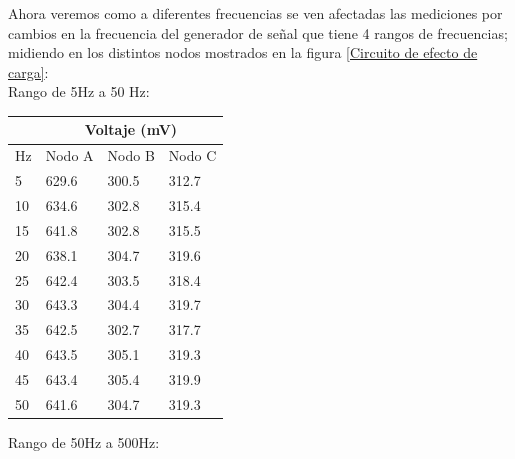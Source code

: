 Ahora veremos como a diferentes frecuencias se ven afectadas las mediciones por cambios en la frecuencia del generador de señal que tiene 4 rangos de frecuencias; midiendo en los distintos nodos mostrados en la figura \ref{Circuito de efecto de carga}:\\

Rango de 5Hz a 50 Hz:

\begin{table}[H]
\centering
\begin{tabular}{l|lll|}
\cline{2-4}
                         & \multicolumn{3}{c|}{Voltaje (mV)}                                  \\ \hline
\multicolumn{1}{|l|}{Hz} & \multicolumn{1}{c|}{Nodo A} & \multicolumn{1}{l|}{Nodo B} & Nodo C \\ \hline
\multicolumn{1}{|l|}{5}  & \multicolumn{1}{l|}{629.6}  & \multicolumn{1}{l|}{300.5}  & 312.7  \\ \hline
\multicolumn{1}{|l|}{10} & \multicolumn{1}{l|}{634.6}  & \multicolumn{1}{l|}{302.8}  & 315.4  \\ \hline
\multicolumn{1}{|l|}{15} & \multicolumn{1}{l|}{641.8}  & \multicolumn{1}{l|}{302.8}  & 315.5  \\ \hline
\multicolumn{1}{|l|}{20} & \multicolumn{1}{l|}{638.1}  & \multicolumn{1}{l|}{304.7}  & 319.6  \\ \hline
\multicolumn{1}{|l|}{25} & \multicolumn{1}{l|}{642.4}  & \multicolumn{1}{l|}{303.5}  & 318.4  \\ \hline
\multicolumn{1}{|l|}{30} & \multicolumn{1}{l|}{643.3}  & \multicolumn{1}{l|}{304.4}  & 319.7  \\ \hline
\multicolumn{1}{|l|}{35} & \multicolumn{1}{l|}{642.5}  & \multicolumn{1}{l|}{302.7}  & 317.7  \\ \hline
\multicolumn{1}{|l|}{40} & \multicolumn{1}{l|}{643.5}  & \multicolumn{1}{l|}{305.1}  & 319.3  \\ \hline
\multicolumn{1}{|l|}{45} & \multicolumn{1}{l|}{643.4}  & \multicolumn{1}{l|}{305.4}  & 319.9  \\ \hline
\multicolumn{1}{|l|}{50} & \multicolumn{1}{l|}{641.6}  & \multicolumn{1}{l|}{304.7}  & 319.3  \\ \hline
\end{tabular}
\end{table}

Rango de 50Hz a 500Hz:

